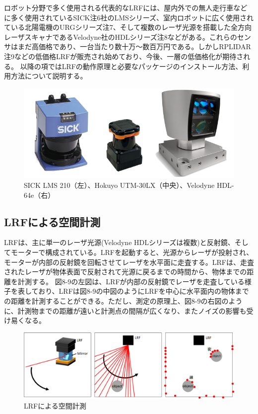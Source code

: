 ロボット分野で多く使用される代表的なLRFには、屋内外での無人走行車などに多く使用されているSICK注6社のLMSシリーズ、室内ロボットに広く使用されている北陽電機のURGシリーズ注7、そして複数のレーザ光源を搭載した全方向レーザスキャナであるVelodyne社のHDLシリーズ注8などがある。これらのセンサはまだ高価格であり、一台当たり数十万～数百万円である。しかしRPLIDAR注9などの低価格LRFが販売され始めており、今後、一層の低価格化が期待される。
以降の項ではLRFの動作原理と必要なパッケージのインストール方法、利用方法について説明する。

\begin{figure}[ht]
  \centering
  \includegraphics[width=\columnwidth]{pictures/chapter8/pic_08_08.png}
  \caption{SICK LMS 210（左）、Hokuyo UTM-30LX（中央）、Velodyne HDL-64e（右）}
\end{figure}

\subsection{LRFによる空間計測}

LRFは、主に単一のレーザ光源(Velodyne HDLシリーズは複数)と反射鏡、そしてモーターで構成されている。LRFを起動すると、光源からレーザが投射され、モーターが内部の反射鏡を回転させてレーザを水平面に走査する。LRFは、走査されたレーザが物体表面で反射されて光源に戻るまでの時間から、物体までの距離を計測する。
図8-9の左図は、LRFが内部の反射鏡でレーザを走査している様子を表しており、LRFは図8-9の中図のようにLRFを中心に水平面内の物体までの距離を計測することができる。ただし、測定の原理上、図8-9の右図のように、計測物までの距離が遠いと計測点の間隔が広くなり、またノイズの影響も受け易くなる。

\begin{figure}[ht]
  \centering
  \includegraphics[width=\columnwidth]{pictures/chapter8/pic_08_09.png}
  \caption{LRFによる空間計測}
\end{figure}

